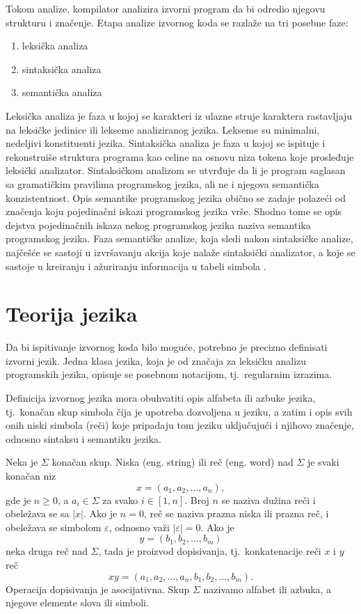 \documentclass[12pt,oneside]{memoir}
\theoremstyle{plain}
\theoremstyle{definition}
\begin{document}
Tokom analize, kompilator analizira izvorni program da bi odredio njegovu strukturu i značenje. Etapa analize izvornog koda se razlaže na tri posebne faze:
\begin{enumerate}
\item leksička analiza
\item sintaksička analiza
\item semantička analiza
\end{enumerate}

Leksička analiza je faza u kojoj se karakteri iz ulazne struje karaktera rastavljaju na leksičke jedinice ili lekseme analiziranog jezika. Lekseme su minimalni, nedeljivi konstituenti jezika. Sintaksička analiza je faza u kojoj se ispituje i rekonstruiše struktura programa kao celine na osnovu niza tokena koje prosleđuje leksički analizator. Sintaksičkom analizom se utvrđuje da li je program saglasan sa gramatičkim pravilima programskog jezika, ali ne i njegova semantička konzistentnost. Opis semantike programskog jezika obično se zadaje polazeći od značenja koju pojedinačni iskazi programskog jezika vrše. Shodno tome se opis dejstva pojedinačnih iskaza nekog programskog jezika naziva semantika programskog jezika. Faza semantičke analize, koja sledi nakon sintaksičke analize, najčešće se sastoji u izvršavanju akcija koje nalaže sintaksički analizator, a koje se sastoje u kreiranju i ažuriranju informacija u tabeli simbola \cite{Vitas}.

\section{Teorija jezika}
Da bi ispitivanje izvornog koda bilo moguće, potrebno je precizno definisati izvorni jezik. Jedna klasa jezika, koja je od značaja za leksičku analizu programskih jezika, opisuje se posebnom notacijom, tj.~regularnim izrazima.

Definicija izvornog jezika mora obuhvatiti opis alfabeta ili azbuke jezika, tj.~konačan skup simbola čija je upotreba dozvoljena u jeziku, a zatim i opis svih onih niski simbola (reči) koje pripadaju tom jeziku uključujući i njihovo značenje, odnosno sintaksu i semantiku jezika. 

Neka je $\Sigma$  konačan skup. Niska (eng. string) ili reč (eng. word) nad $\Sigma$ je svaki konačan niz $$x = (a_1, a_2, …, a_n),$$ gde je $n \geq 0$, a $a_i \in \Sigma$ za svako $\textit{i} \in [1,n]$. Broj $n$ se naziva dužina reči i obeležava se sa $|x|$. Ako je $n=0$, reč se naziva prazna niska ili prazna reč, i obeležava se simbolom $\varepsilon$, odnosno važi $| \varepsilon |=0$.  Ako je $$y = (b_1, b_2, …, b_m)$$ neka druga reč nad $\Sigma$, tada je proizvod dopisivanja, tj.~konkatenacije reči $x$ i $y$ reč $$xy =(a_1, a_2, …, a_n, b_1, b_2, …, b_m).$$
Operacija dopisivanja je asocijativna. Skup $\Sigma$ nazivamo alfabet ili azbuka, a njegove elemente slova ili simboli.
\end{document}
